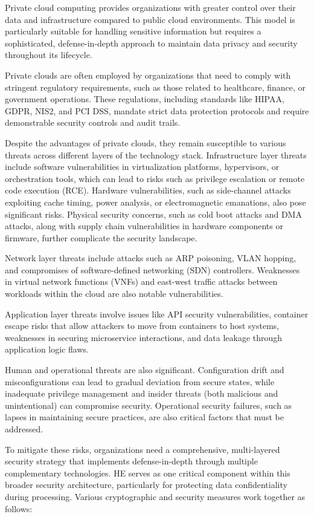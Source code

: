 \documentclass[
  letterpaper,
  DIV=11,
  numbers=noendperiod,
  oneside]{scrartcl}
\begin{document}
Private cloud computing provides organizations with greater control over
their data and infrastructure compared to public cloud environments.
This model is particularly suitable for handling sensitive information
but requires a sophisticated, defense-in-depth approach to maintain data
privacy and security throughout its lifecycle.

Private clouds are often employed by organizations that need to comply
with stringent regulatory requirements, such as those related to
healthcare, finance, or government operations. These regulations,
including standards like HIPAA, GDPR, NIS2, and PCI DSS, mandate strict
data protection protocols and require demonstrable security controls and
audit trails.

Despite the advantages of private clouds, they remain susceptible to
various threats across different layers of the technology stack.
Infrastructure layer threats include software vulnerabilities in
virtualization platforms, hypervisors, or orchestration tools, which can
lead to risks such as privilege escalation or remote code execution
(RCE). Hardware vulnerabilities, such as side-channel attacks exploiting
cache timing, power analysis, or electromagnetic emanations, also pose
significant risks. Physical security concerns, such as cold boot attacks
and DMA attacks, along with supply chain vulnerabilities in hardware
components or firmware, further complicate the security landscape.

Network layer threats include attacks such as ARP poisoning, VLAN
hopping, and compromises of software-defined networking (SDN)
controllers. Weaknesses in virtual network functions (VNFs) and
east-west traffic attacks between workloads within the cloud are also
notable vulnerabilities.

Application layer threats involve issues like API security
vulnerabilities, container escape risks that allow attackers to move
from containers to host systems, weaknesses in securing microservice
interactions, and data leakage through application logic flaws.

Human and operational threats are also significant. Configuration drift
and misconfigurations can lead to gradual deviation from secure states,
while inadequate privilege management and insider threats (both
malicious and unintentional) can compromise security. Operational
security failures, such as lapses in maintaining secure practices, are
also critical factors that must be addressed.

To mitigate these risks, organizations need a comprehensive,
multi-layered security strategy that implements defense-in-depth through
multiple complementary technologies. HE serves as one critical component
within this broader security architecture, particularly for protecting
data confidentiality during processing. Various cryptographic and
security measures work together as follows:
\end{document}
